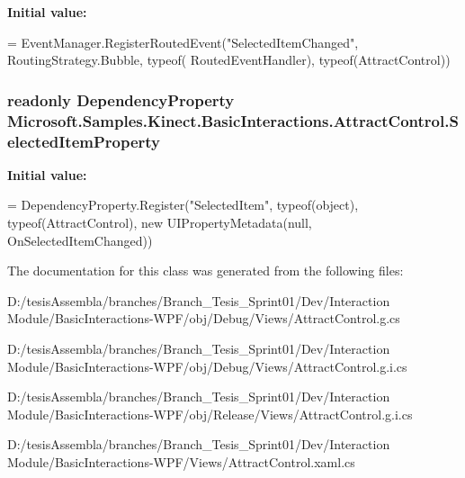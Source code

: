{\bfseries Initial value\-:}
\begin{DoxyCode}
=
            EventManager.RegisterRoutedEvent(\textcolor{stringliteral}{"SelectedItemChanged"}, RoutingStrategy.Bubble, typeof(
      RoutedEventHandler), typeof(AttractControl))
\end{DoxyCode}
\hypertarget{class_microsoft_1_1_samples_1_1_kinect_1_1_basic_interactions_1_1_attract_control_ac261364ca11e9ac04735198ae0293d6e}{
\subsubsection[{Selected\-Item\-Property}]{\setlength{\rightskip}{0pt plus 5cm}readonly Dependency\-Property Microsoft.\-Samples.\-Kinect.\-Basic\-Interactions.\-Attract\-Control.\-Selected\-Item\-Property\hspace{0.3cm}{\ttfamily [static]}}}\label{class_microsoft_1_1_samples_1_1_kinect_1_1_basic_interactions_1_1_attract_control_ac261364ca11e9ac04735198ae0293d6e}
{\bfseries Initial value\-:}
\begin{DoxyCode}
=
            DependencyProperty.Register(\textcolor{stringliteral}{"SelectedItem"}, typeof(\textcolor{keywordtype}{object}), typeof(AttractControl), \textcolor{keyword}{new} 
      UIPropertyMetadata(null, OnSelectedItemChanged))
\end{DoxyCode}


The documentation for this class was generated from the following files\-:\begin{DoxyCompactItemize}
\item 
D\-:/tesis\-Assembla/branches/\-Branch\-\_\-\-Tesis\-\_\-\-Sprint01/\-Dev/\-Interaction Module/\-Basic\-Interactions-\/\-W\-P\-F/obj/\-Debug/\-Views/Attract\-Control.\-g.\-cs\item 
D\-:/tesis\-Assembla/branches/\-Branch\-\_\-\-Tesis\-\_\-\-Sprint01/\-Dev/\-Interaction Module/\-Basic\-Interactions-\/\-W\-P\-F/obj/\-Debug/\-Views/Attract\-Control.\-g.\-i.\-cs\item 
D\-:/tesis\-Assembla/branches/\-Branch\-\_\-\-Tesis\-\_\-\-Sprint01/\-Dev/\-Interaction Module/\-Basic\-Interactions-\/\-W\-P\-F/obj/\-Release/\-Views/Attract\-Control.\-g.\-i.\-cs\item 
D\-:/tesis\-Assembla/branches/\-Branch\-\_\-\-Tesis\-\_\-\-Sprint01/\-Dev/\-Interaction Module/\-Basic\-Interactions-\/\-W\-P\-F/\-Views/Attract\-Control.\-xaml.\-cs\end{DoxyCompactItemize}
